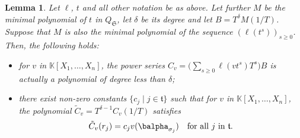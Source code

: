 \documentclass[12pt]{article}
\newtheorem{Lemma}{Lemma}
\def\K {\ensuremath{\mathbb{K}}}
\def\K{\mathbb{K}}
\begin{document}
\begin{Lemma} \label{lemma:anyv}
	Let $\ell$, $t$ and all other notation be as above. Let further
	$M$ be the minimal polynomial of $t$ in $Q_\mathfrak{S}$, let
	$\delta$ be its degree and let $B=T^\delta M(1/T)$. Suppose that 
	$M$ is also the minimal polynomial of the sequence $(\ell(t^s))_{s \ge 0}$.
	Then, the following holds:
	\begin{itemize}
		\item for $v$ in $\K[X_1,\dots,X_n]$, the power series $C_v =
		\Big(\sum_{s \ge 0} \ell(v t^s)T^s\Big)B$ is actually a polynomial
		of degree less than $\delta$;
		\item there exist non-zero constants $\{c_j \mid j \in
		\mathfrak{t}\}$  such that for $v$ in
		$\K[X_1,\dots,X_n]$, the polynomial $\tilde C_v = T^{\delta-1}
		C_v(1/T)$ satisfies
		$$\tilde C_v(r_j) = c_{j} v(\balpha_{\sigma_j}) \quad \text{for all $j$ in $\mathfrak{t}$.}$$
	\end{itemize}
\end{Lemma}
\end{document}
